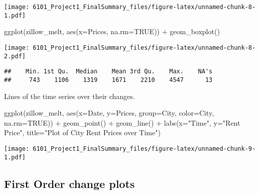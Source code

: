 \documentclass[
]{article}
\newenvironment{Shaded}{\begin{snugshade}}{\end{snugshade}}
\newcommand{\AttributeTok}[1]{\textcolor[rgb]{0.77,0.63,0.00}{#1}}
\newcommand{\ConstantTok}[1]{\textcolor[rgb]{0.00,0.00,0.00}{#1}}
\newcommand{\FunctionTok}[1]{\textcolor[rgb]{0.00,0.00,0.00}{#1}}
\newcommand{\NormalTok}[1]{#1}
\newcommand{\SpecialCharTok}[1]{\textcolor[rgb]{0.00,0.00,0.00}{#1}}
\newcommand{\StringTok}[1]{\textcolor[rgb]{0.31,0.60,0.02}{#1}}
\begin{document}
\texttt{[image: 6101\_Project1\_FinalSummary\_files/figure-latex/unnamed-chunk-8-1.pdf]}

\begin{Shaded}
\begin{Highlighting}[]
\FunctionTok{ggplot}\NormalTok{(zillow\_melt, }\FunctionTok{aes}\NormalTok{(}\AttributeTok{x=}\NormalTok{Prices, }\AttributeTok{na.rm=}\ConstantTok{TRUE}\NormalTok{)) }\SpecialCharTok{+} \FunctionTok{geom\_boxplot}\NormalTok{()}
\end{Highlighting}
\end{Shaded}

\texttt{[image: 6101\_Project1\_FinalSummary\_files/figure-latex/unnamed-chunk-8-2.pdf]}

\begin{Shaded}
\end{Shaded}

\begin{verbatim}
##    Min. 1st Qu.  Median    Mean 3rd Qu.    Max.    NA's 
##     743    1106    1319    1671    2210    4547      13
\end{verbatim}

Lines of the time series over their changes.

\begin{Shaded}
\begin{Highlighting}[]
\FunctionTok{ggplot}\NormalTok{(zillow\_melt, }\FunctionTok{aes}\NormalTok{(}\AttributeTok{x=}\NormalTok{Date, }\AttributeTok{y=}\NormalTok{Prices, }\AttributeTok{group=}\NormalTok{City, }\AttributeTok{color=}\NormalTok{City, }\AttributeTok{na.rm=}\ConstantTok{TRUE}\NormalTok{)) }\SpecialCharTok{+} \FunctionTok{geom\_point}\NormalTok{() }\SpecialCharTok{+} \FunctionTok{geom\_line}\NormalTok{() }\SpecialCharTok{+} \FunctionTok{labs}\NormalTok{(}\AttributeTok{x=}\StringTok{"Time"}\NormalTok{, }\AttributeTok{y=}\StringTok{"Rent Price"}\NormalTok{, }\AttributeTok{title=}\StringTok{"Plot of City Rent Prices over Time"}\NormalTok{)}
\end{Highlighting}
\end{Shaded}

\texttt{[image: 6101\_Project1\_FinalSummary\_files/figure-latex/unnamed-chunk-9-1.pdf]}

\hypertarget{first-order-change-plots}{%
\subsection{First Order change plots}\label{first-order-change-plots}}
\end{document}
